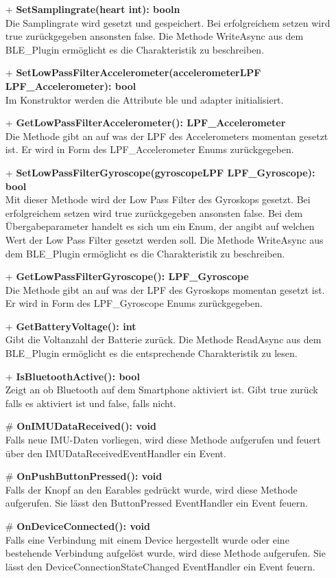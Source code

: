 \documentclass[a4paper,12pt]{article}
\begin{document}
\begin{itemize}
	\item[+] \textbf{SetSamplingrate(heart int): booln}\\Die Samplingrate wird gesetzt und gespeichert. Bei erfolgreichem setzen wird true zurückgegeben ansonsten false. Die Methode WriteAsync aus dem BLE\_Plugin ermöglicht es die Charakteristik zu beschreiben.
	\item[+] \textbf{SetLowPassFilterAccelerometer(accelerometerLPF LPF\_Accelerometer): bool}\\ Im Konstruktor werden die Attribute ble und adapter initialisiert.
	\item[+] \textbf{GetLowPassFilterAccelerometer(): LPF\_Accelerometer}\\ Die Methode gibt an auf was der LPF des Accelerometers momentan gesetzt ist. Er wird in Form des LPF\_Accelerometer Enums zurückgegeben. 
	\item[+] \textbf{SetLowPassFilterGyroscope(gyroscopeLPF LPF\_Gyroscope): bool}\\ Mit dieser Methode wird der Low Pass Filter des Gyroskops gesetzt. Bei erfolgreichem setzen wird true zurückgegeben ansonsten false. Bei dem Übergabeparameter handelt es sich um ein Enum, der angibt auf welchen Wert der Low Pass Filter gesetzt werden soll. Die Methode WriteAsync aus dem BLE\_Plugin ermöglicht es die Charakteristik zu beschreiben.
	\item[+] \textbf{GetLowPassFilterGyroscope(): LPF\_Gyroscope}\\Die Methode gibt an auf was der LPF des Gyroskops momentan gesetzt ist. Er wird in Form des LPF\_Gyroscope Enums zurückgegeben. 
	\item[+] \textbf{GetBatteryVoltage(): int}\\ Gibt die Voltanzahl der Batterie zurück. Die Methode ReadAsync aus dem BLE\_Plugin ermöglicht es die entsprechende Charakteristik zu lesen.
	\item[+] \textbf{IsBluetoothActive(): bool}\\ Zeigt an ob Bluetooth auf dem Smartphone aktiviert ist. Gibt true zurück falls es aktiviert ist und false, falls nicht.
	\item[\#] \textbf{OnIMUDataReceived(): void}\\Falls neue IMU-Daten vorliegen, wird diese Methode aufgerufen und feuert über den IMUDataReceivedEventHandler ein Event.
	\item[\#] \textbf{OnPushButtonPressed(): void}\\ Falls der Knopf an den \Gls{Earables} gedrückt wurde, wird diese Methode aufgerufen. Sie lässt den ButtonPressed EventHandler ein Event feuern.
	\item[\#] \textbf{OnDeviceConnected(): void}\\ Falls eine Verbindung mit einem Device hergestellt wurde oder eine bestehende Verbindung aufgelöst wurde, wird diese Methode aufgerufen. Sie lässt den DeviceConnectionStateChanged EventHandler ein Event feuern.
\end{itemize}
\end{document}
